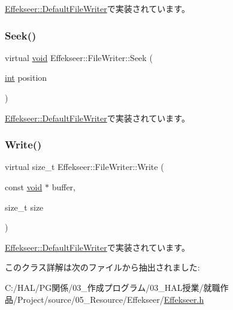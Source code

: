 \mbox{\hyperlink{class_effekseer_1_1_default_file_writer_aa85409b51ae30ea259ce2d0f0bd30656}{Effekseer\+::\+Default\+File\+Writer}}で実装されています。

\mbox{\label{class_effekseer_1_1_file_writer_a9057c57df33d5112bc0d2c4e3e0c542d}} 
\subsubsection{\texorpdfstring{Seek()}{Seek()}}
{\footnotesize\ttfamily virtual \mbox{\hyperlink{namespace_effekseer_ab34c4088e512200cf4c2716f168deb56}{void}} Effekseer\+::\+File\+Writer\+::\+Seek (\begin{DoxyParamCaption}\item[{\mbox{\hyperlink{namespace_effekseer_ace0abf7c2e6947e519ebe8b54cbcc30a}{int}}}]{position }\end{DoxyParamCaption})\hspace{0.3cm}{\ttfamily [pure virtual]}}



\mbox{\hyperlink{class_effekseer_1_1_default_file_writer_a2329533000c58267e8e2457f3480bf73}{Effekseer\+::\+Default\+File\+Writer}}で実装されています。

\mbox{\label{class_effekseer_1_1_file_writer_a7bdd5dc4f70f8e83c03de7e96af5dc27}} 
\subsubsection{\texorpdfstring{Write()}{Write()}}
{\footnotesize\ttfamily virtual size\+\_\+t Effekseer\+::\+File\+Writer\+::\+Write (\begin{DoxyParamCaption}\item[{const \mbox{\hyperlink{namespace_effekseer_ab34c4088e512200cf4c2716f168deb56}{void}} $\ast$}]{buffer,  }\item[{size\+\_\+t}]{size }\end{DoxyParamCaption})\hspace{0.3cm}{\ttfamily [pure virtual]}}



\mbox{\hyperlink{class_effekseer_1_1_default_file_writer_afceaff03cd45477058ffdc1370d06884}{Effekseer\+::\+Default\+File\+Writer}}で実装されています。



このクラス詳解は次のファイルから抽出されました\+:\begin{DoxyCompactItemize}
\item 
C\+:/\+H\+A\+L/\+P\+G関係/03\+\_\+作成プログラム/03\+\_\+\+H\+A\+L授業/就職作品/\+Project/source/05\+\_\+\+Resource/\+Effekseer/\mbox{\hyperlink{_effekseer_8h}{Effekseer.\+h}}\end{DoxyCompactItemize}
